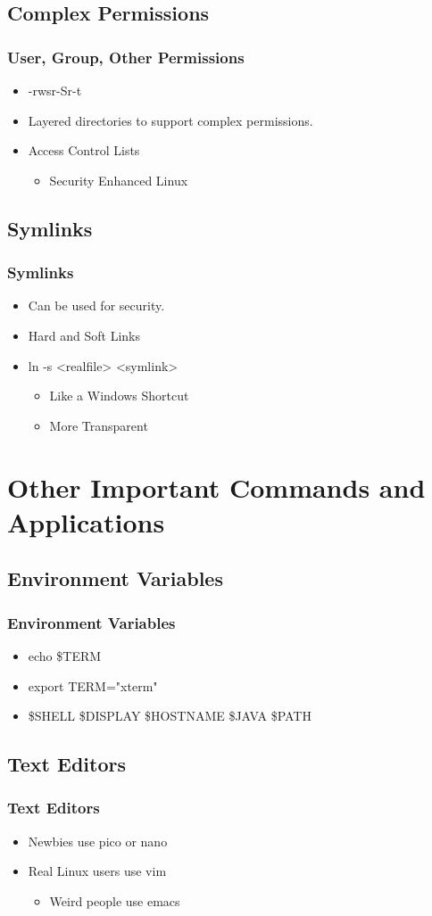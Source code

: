 \documentclass[hyperref={pdfpagelabels=false}]{beamer}
\begin{document}
\subsection{Complex Permissions}
\frame
{
    \frametitle{User, Group, Other Permissions}
    \begin{itemize}
    \item{-rwsr-Sr-t}
    \item{Layered directories to support complex permissions.}
    \item{Access Control Lists}
        \begin{itemize}
        \item{Security Enhanced Linux}
        \end{itemize}
    \end{itemize}
}
\subsection{Symlinks}
\frame
{
    \frametitle{Symlinks}
    \begin{itemize}
    \item{Can be used for security.}
    \item{Hard and Soft Links}
    \item{ln -s <realfile> <symlink>}
        \begin{itemize}
        \item{Like a Windows Shortcut}
        \item{More Transparent}
        \end{itemize}
    \end{itemize}
}
\section{Other Important Commands and Applications}
\subsection{Environment Variables}
\frame
{
    \frametitle{Environment Variables}
    \begin{itemize}
    \item{echo \$TERM}
    \item{export TERM="xterm"}
    \item{\$SHELL \$DISPLAY \$HOSTNAME \$JAVA \$PATH}
    \end{itemize}
}
\subsection{Text Editors}
\frame
{	
    \frametitle{Text Editors}
    \begin{itemize}
    \item{Newbies use pico or nano}
    \item{Real Linux users use vim}
        \begin{itemize}
        \item{Weird people use emacs}
        \end{itemize}
    \end{itemize}
}
\end{document}
